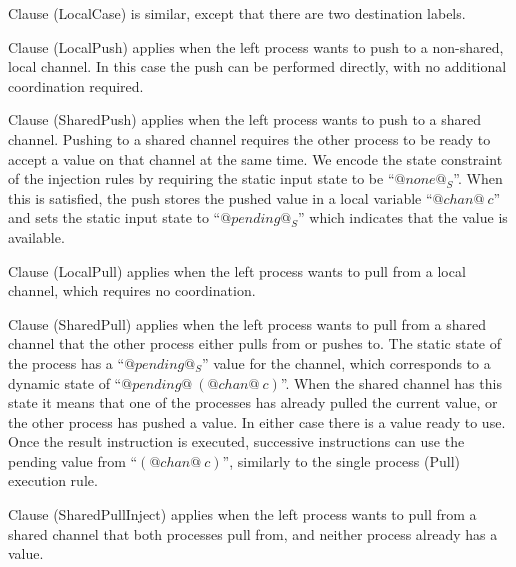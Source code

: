 
Clause (LocalCase) is similar, except that there are two destination labels.

Clause (LocalPush) applies when the left process wants to push to a non-shared, local channel.
In this case the push can be performed directly, with no additional coordination required.

Clause (SharedPush) applies when the left process wants to push to a shared channel. Pushing to a shared channel requires the other process to be ready to accept a value on that channel at the same time. We encode the state constraint of the injection rules by requiring the static input state to be ``$@none@_S$''. When this is satisfied, the push stores the pushed value in a local variable ``$@chan@~c$'' and sets the static input state to ``$@pending@_S$'' which indicates that the value is available.


\eject{}
Clause (LocalPull) applies when the left process wants to pull from a local channel, which requires no coordination.

Clause (SharedPull) applies when the left process wants to pull from a shared channel that the other process either pulls from or pushes to.
The static state of the process has a ``$@pending@_S$'' value for the channel, which corresponds to a dynamic state of ``$@pending@~(@chan@~c)$''.
When the shared channel has this state it means that one of the processes has already pulled the current value, or the other process has pushed a value. In either case there is a value ready to use. Once the result instruction is executed, successive instructions can use the pending value from ``$(@chan@~c)$'', similarly to the single process (Pull) execution rule.

Clause (SharedPullInject) applies when the left process wants to pull from a shared channel that both processes pull from, and neither process already has a value.


